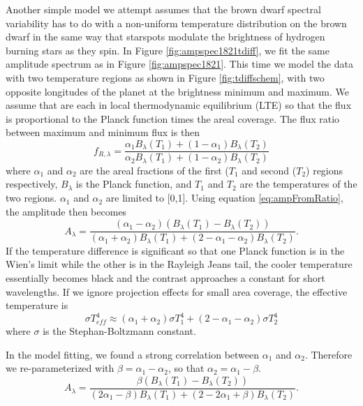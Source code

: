 \documentclass[twocolumn]{aastex6}
\begin{document}
Another simple model we attempt assumes  that the brown dwarf spectral variability has to do with a non-uniform temperature distribution on the brown dwarf in the same way that starspots modulate the brightness of hydrogen burning stars as they spin.
In Figure \ref{fig:ampspec1821tdiff}, we fit the same amplitude spectrum as in Figure \ref{fig:ampspec1821}.
This time we model the data with two temperature regions as shown in Figure \ref{fig:tdiffschem}, with two opposite longitudes of the planet at the brightness minimum and maximum.
We assume that are each in local thermodynamic equilibrium (LTE) so that the flux is proportional to the Planck function times the areal coverage.
The flux ratio between maximum and minimum flux is then
\begin{equation}
f_{R,\lambda} = \frac{\alpha_1 B_\lambda(T_1) + (1-\alpha_1) B_\lambda(T_2)}{\alpha_2 B_\lambda(T_1) + (1-\alpha_2) B_\lambda(T_2)}
\end{equation}
where $\alpha_1$ and $\alpha_2$ are the areal fractions of the first ($T_1$ and second ($T_2$) regions respectively, $B_\lambda$ is the Planck function, and $T_1$ and $T_2$ are the temperatures of the two regions.
$\alpha_1$ and $\alpha_2$ are limited to [0,1].
Using equation \ref{eq:ampFromRatio}, the amplitude then becomes
\begin{equation}\label{eq:twoTempAmpAlphas}
A_\lambda = \frac{\left(\alpha_1 - \alpha_2 \right) \left(B_\lambda(T_1) - B_\lambda(T_2) \right)}{\left(\alpha_1 + \alpha_2\right) B_\lambda(T_1) + \left(2 - \alpha_1 - \alpha_2\right) B_\lambda(T_2)}.
\end{equation}
If the temperature difference is significant so that one Planck function is in the Wien's limit while the other is in the Rayleigh Jeans tail, the cooler temperature essentially becomes black and the contrast approaches a constant for short wavelengths.
If we ignore projection effects for small area coverage, the effective temperature is 
\begin{equation}
\sigma T_{eff}^4 \approx (\alpha_1 + \alpha_2) \sigma T_1^4 + (2 - \alpha_1 - \alpha_2) \sigma T_2^4
\end{equation}
where $\sigma$ is the Stephan-Boltzmann constant.

In the model fitting, we found a strong correlation between $\alpha_1$ and $\alpha_2$.
Therefore we re-parameterized with $\beta = \alpha_1 - \alpha_2$, so that $\alpha_2 = \alpha_1 - \beta$.
\begin{equation}\label{eq:twoTempAmp}
A_\lambda = \frac{\beta \left(B_\lambda(T_1) - B_\lambda(T_2) \right)}{\left(2 \alpha_1 - \beta \right) B_\lambda(T_1) + \left(2 - 2 \alpha_1 + \beta \right) B_\lambda(T_2)}.
\end{equation}
\end{document}
